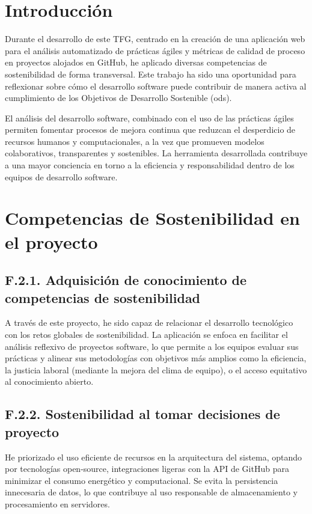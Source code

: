 
\section{Introducción}
Durante el desarrollo de este TFG, centrado en la creación de una aplicación web para el análisis automatizado de prácticas ágiles y métricas de calidad de proceso en proyectos alojados en GitHub, he aplicado diversas competencias de sostenibilidad de forma transversal. Este trabajo ha sido una oportunidad para reflexionar sobre cómo el desarrollo software puede contribuir de manera activa al cumplimiento de los Objetivos de Desarrollo Sostenible (\acrfull{ods}).

El análisis del desarrollo software, combinado con el uso de las prácticas ágiles permiten fomentar procesos de mejora continua que reduzcan el desperdicio de recursos humanos y computacionales, a la vez que promueven modelos colaborativos, transparentes y sostenibles. La herramienta desarrollada contribuye a una mayor conciencia en torno a la eficiencia y responsabilidad dentro de los equipos de desarrollo software.

\section{Competencias de Sostenibilidad en el proyecto}

\subsection{F.2.1. Adquisición de conocimiento de competencias de sostenibilidad}
A través de este proyecto, he sido capaz de relacionar el desarrollo tecnológico con los retos globales de sostenibilidad. La aplicación se enfoca en facilitar el análisis reflexivo de proyectos software, lo que permite a los equipos evaluar sus prácticas y alinear sus metodologías con objetivos más amplios como la eficiencia, la justicia laboral (mediante la mejora del clima de equipo), o el acceso equitativo al conocimiento abierto.

\subsection{F.2.2. Sostenibilidad al tomar decisiones de proyecto}
He priorizado el uso eficiente de recursos en la arquitectura del sistema, optando por tecnologías open-source, integraciones ligeras con la API de GitHub para minimizar el consumo energético y computacional. Se evita la persistencia innecesaria de datos, lo que contribuye al uso responsable de almacenamiento y procesamiento en servidores.

